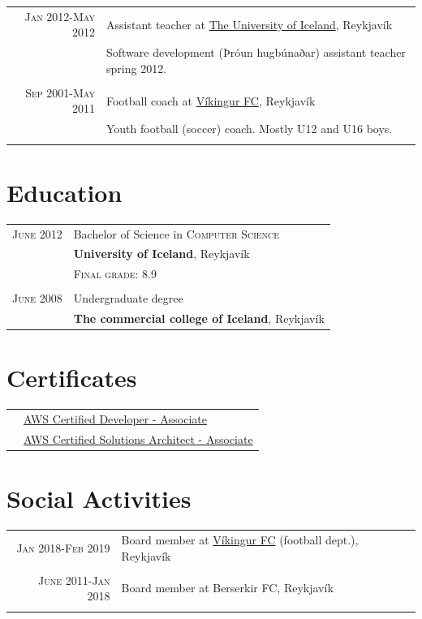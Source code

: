 \documentclass[a4paper,10pt]{article}
\begin{document}
\begin{tabular}{r|p{10cm}}
 \textsc{Jan 2012-May 2012} & Assistant teacher at \href{www.hi.is}{The University of Iceland}, Reykjavík \\&\footnotesize{Software development (Þróun hugbúnaðar) assistant teacher spring 2012.}\\\multicolumn{2}{c}{} \\

 \textsc{Sep 2001-May 2011} & Football coach at \href{www.vikingur.is}{Víkingur FC}, Reykjavík \\&\footnotesize{Youth football (soccer) coach. Mostly U12 and U16 boys.}\\\multicolumn{2}{c}{} \\

 \end{tabular}

\section{Education}
\begin{tabular}{rl}
 \textsc{June} 2012 & Bachelor of Science in \textsc{Computer Science}\\&\textbf{University of Iceland}, Reykjavík\\
&\normalsize \textsc{Final grade}: 8.9\\&\\

 \textsc{June} 2008 & Undergraduate degree\\&\textbf{The commercial college of Iceland}, Reykjavík
\end{tabular}

\section{Certificates}
\begin{tabular}{rl}
    & \href{https://aws.amazon.com/certification/certified-developer-associate/}{AWS Certified Developer - Associate}\\
    & \href{https://aws.amazon.com/certification/certified-solutions-architect-associate/}{AWS Certified Solutions Architect - Associate}
\end{tabular}



\section{Social Activities}
\begin{tabular}{r|p{10cm}}

 \textsc{Jan 2018-Feb 2019} & Board member at \href{www.vikingur.is}{Víkingur FC} (football dept.), Reykjavík \\\multicolumn{2}{c}{} \\

 \textsc{June 2011-Jan 2018} & Board member at Berserkir FC, Reykjavík \\\multicolumn{2}{c}{} \\

\end{tabular}
\end{document}
